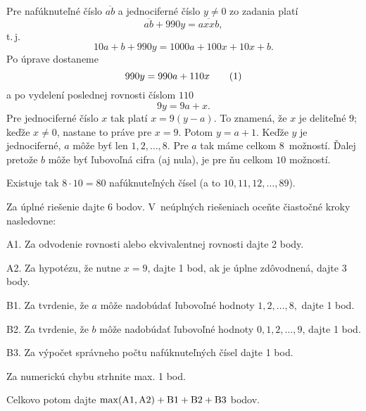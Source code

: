 {%
Pre nafúknuteľné číslo $\overline{ab}$ a jednociferné číslo $y\ne 0$ zo zadania platí
$$\overline{ab}+990y =\overline{axxb},
$$
t.\,j.
$$
10a+b + 990 y=1000a+100x+10x+b.
$$
Po úprave dostaneme
$$
 990 y=990a+110x
 \tag1
$$
a po vydelení poslednej rovnosti číslom $110$
$$
 9 y=9a+x.
$$
Pre jednociferné číslo $x$ tak platí
$x=9(y-a)$. To znamená, že $x$ je deliteľné $9$; keďže $x \ne 0$, nastane to práve pre
$x=9$. Potom $y= a+1$. Keďže $y$ je jednociferné, $a$ môže byť len $1,2,\ldots,8$. Pre $a$ tak máme celkom 8~možností. Ďalej pretože $b$ môže byť ľubovoľná cifra (aj nula), je pre ňu celkom $10$ možností.

\zaver
Existuje tak $8 \cdot 10 = 80$ nafúknuteľných čísel (a to $10,11,12,\ldots,89$).

\schemaABC
Za úplné riešenie dajte 6 bodov. V~neúplných riešeniach oceňte čiastočné kroky nasledovne:

\smallskip
\item{A1.} Za odvodenie rovnosti  alebo ekvivalentnej rovnosti dajte 2 body.
\item{A2.} Za hypotézu, že nutne $x=9$, dajte 1 bod, ak je úplne zdôvodnená, dajte 3 body.
\item{B1.} Za tvrdenie, že $a$ môže nadobúdať ľubovoľné hodnoty $1,2,\ldots,8,$ dajte 1 bod.
\item{B2.} Za tvrdenie, že $b$ môže nadobúdať ľubovoľné hodnoty $0,1,2,\ldots,9$, dajte 1 bod.
\item{B3.} Za výpočet správneho počtu nafúknuteľných čísel dajte 1 bod.

\smallskip\noindent
Za numerickú chybu strhnite max. 1 bod.

Celkovo potom dajte $\rm\max(A1,A2)+B1+B2+B3$ bodov.

\endschema
}

